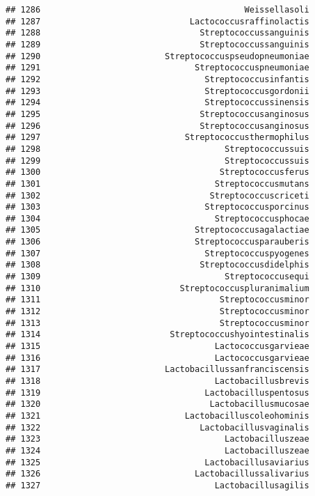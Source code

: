 \documentclass[
]{article}
\begin{document}
\begin{verbatim}
## 1286                                         Weissellasoli
## 1287                              Lactococcusraffinolactis
## 1288                                Streptococcussanguinis
## 1289                                Streptococcussanguinis
## 1290                         Streptococcuspseudopneumoniae
## 1291                               Streptococcuspneumoniae
## 1292                                 Streptococcusinfantis
## 1293                                 Streptococcusgordonii
## 1294                                 Streptococcussinensis
## 1295                                Streptococcusanginosus
## 1296                                Streptococcusanginosus
## 1297                             Streptococcusthermophilus
## 1298                                     Streptococcussuis
## 1299                                     Streptococcussuis
## 1300                                    Streptococcusferus
## 1301                                   Streptococcusmutans
## 1302                                  Streptococcuscriceti
## 1303                                 Streptococcusporcinus
## 1304                                   Streptococcusphocae
## 1305                               Streptococcusagalactiae
## 1306                               Streptococcusparauberis
## 1307                                 Streptococcuspyogenes
## 1308                                Streptococcusdidelphis
## 1309                                     Streptococcusequi
## 1310                            Streptococcuspluranimalium
## 1311                                    Streptococcusminor
## 1312                                    Streptococcusminor
## 1313                                    Streptococcusminor
## 1314                          Streptococcushyointestinalis
## 1315                                   Lactococcusgarvieae
## 1316                                   Lactococcusgarvieae
## 1317                         Lactobacillussanfranciscensis
## 1318                                   Lactobacillusbrevis
## 1319                                 Lactobacilluspentosus
## 1320                                  Lactobacillusmucosae
## 1321                             Lactobacilluscoleohominis
## 1322                                Lactobacillusvaginalis
## 1323                                     Lactobacilluszeae
## 1324                                     Lactobacilluszeae
## 1325                                 Lactobacillusaviarius
## 1326                               Lactobacillussalivarius
## 1327                                   Lactobacillusagilis

\end{verbatim}
\end{document}
